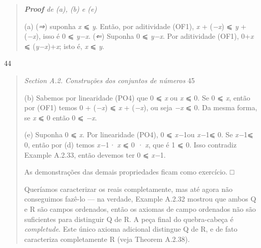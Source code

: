 \documentclass[
]{article}
\begin{document}
\begin{quote}
\emph{\textbf{Proof} de (a), (b) e (e)}

(a) (\emph{⇒}) suponha \emph{x} ⩽ \emph{y}. Então, por aditividade
(OF1), \emph{x} + (\emph{−x}) ⩽ \emph{y} + (\emph{−x}), isso é 0 ⩽
\emph{y−x}. (\emph{⇐}) Suponha 0 ⩽ \emph{y−x}. Por aditividade (OF1),
0+\emph{x} ⩽ (\emph{y−x})+\emph{x}; isto é, \emph{x} ⩽ \emph{y}.
\end{quote}

44

\begin{quote}
\emph{Section A.2. Construções dos conjuntos de números} 45

(b) Sabemos por linearidade (PO4) que 0 ⩽ \emph{x} ou \emph{x} ⩽ 0. Se 0
⩽ \emph{x}, então por (OF1) temos 0 + (\emph{−x}) ⩽ \emph{x} +
(\emph{−x}), ou seja \emph{−x} ⩽ 0. Da mesma forma, se \emph{x} ⩽ 0
então 0 ⩽ \emph{−x}.

(e) Suponha 0 ⩽ \emph{x}. Por linearidade (PO4), 0 ⩽ \emph{x−}1ou
\emph{x−}1⩽ 0. Se \emph{x−}1⩽ 0, então por (d) temos \emph{x−}1\emph{·
x} ⩽ 0 \emph{· x}, que é 1 ⩽ 0. Isso contradiz Example A.2.33, então
devemos ter 0 ⩽ \emph{x−}1.

As demonstrações das demais propriedades ficam como exercício. □

Queríamos caracterizar os reais completamente, mas até agora não
conseguimos fazê-lo --- na verdade, Example A.2.32 mostrou que ambos Q e
R são campos ordenados, então os axiomas de campo ordenados não são
suficientes para distinguir Q de R. A peça final do quebra-cabeça é
\emph{completude}. Este único axioma adicional distingue Q de R, e de
fato caracteriza completamente R (veja Theorem A.2.38).
\end{quote}
\end{document}
